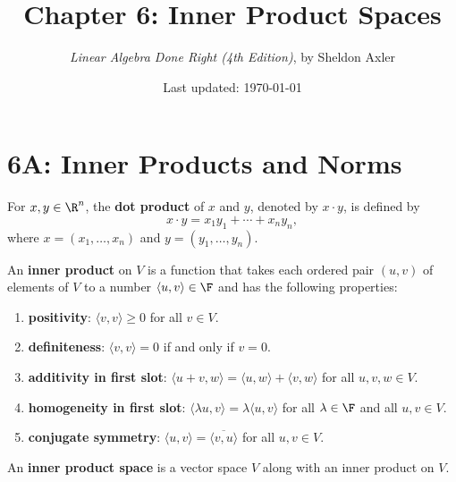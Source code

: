 \documentclass{extarticle}
\title{\vspace{-2em}Chapter 6: Inner Product Spaces}
\author{\emph{Linear Algebra Done Right (4th Edition)}, by Sheldon Axler}
\date{Last updated: \today}
\begin{document}
\maketitle 
\tableofcontents
\newpage


\section*{6A: Inner Products and Norms}

\begin{definition}
    For \(x, y \in \R^n\), the \textbf{dot product} of \(x\) and \(y\), denoted by 
    \(x \cdot y\), is defined by 
    \[x \cdot y = x_1 y_1 + \cdots + x_n y_n,\]
    where \(x = (x_1, \ldots, x_n)\) and \(y = (y_1, \ldots, y_n)\).
\end{definition}

\begin{definition}
    An \textbf{inner product} on \(V\) is a function that takes each ordered pair \((u, v)\) of elements of 
    \(V\) to a number \(\langle u,v \rangle \in \F\) and has the following properties:
    \begin{enumerate}[label=(\alph*)]
        \item \textbf{positivity}: \(\langle v,v \rangle \geq 0\) for all  \(v \in V\). 
        \item \textbf{definiteness}: \(\langle v,v \rangle = 0\) if and only if \(v = 0\). 
        \item \textbf{additivity in first slot}: \(\langle u+v,w \rangle = \langle u, w\rangle 
        + \langle v,w \rangle\) for all \(u, v, w \in V\). 
        \item \textbf{homogeneity in first slot}: \(\langle \lambda u,v \rangle 
        = \lambda \langle u,v \rangle\) for all \(\lambda \in \F\) and all \(u, v \in V\). 
        \item \textbf{conjugate symmetry}: \(\langle u,v \rangle = \overline{\langle v,u\rangle}\)
        for all \(u, v \in V\).
    \end{enumerate}
\end{definition}

\begin{definition}
    An \textbf{inner product space} is a vector space \(V\) along with an inner product on \(V\).
\end{definition}
\end{document}
